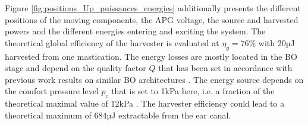 \documentclass[3p,twocolumn,preprint]{elsarticle}
\begin{document}
Figure \ref{fig:positions_Up_puissances_energies} additionally presents the different positions of the moving components, the APG voltage, the source and harvested powers and the different energies entering and exciting the system. The theoretical global efficiency of the harvester is evaluated at \mbox{$\eta_g=76$\%} with 20µJ harvested from one mastication. The energy losses are mostly located in the BO stage and depend on the quality factor $Q$ that has been set in accordance with previous work results on similar BO architectures \cite{Liu2013}. The energy source depends on the comfort pressure level $p_c$ that is set to 1kPa here, i.e. a fraction of the theoretical maximal value of $12$kPa \cite{Bouchard-Roy2020}. The harvester efficiency could lead to a theoretical maximum of $684$µJ extractable from the ear canal.
\end{document}
